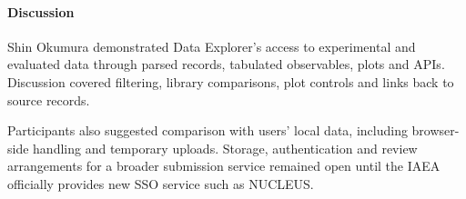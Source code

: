 \paragraph{Discussion}
Shin Okumura demonstrated Data Explorer's access to experimental and evaluated data through parsed records, tabulated observables, plots and APIs. Discussion covered filtering, library comparisons, plot controls and links back to source records. 

Participants also suggested comparison with users' local data, including browser-side handling and temporary uploads. Storage, authentication and review arrangements for a broader submission service remained open until the IAEA officially provides new SSO service such as NUCLEUS. 